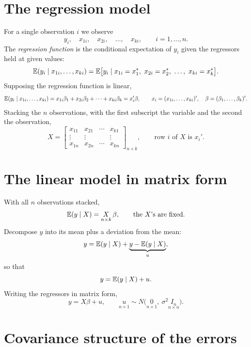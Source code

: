 \documentclass[11pt]{article}
\begin{document}

\section{The regression model}

For a single observation $i$ we observe
\[ y_i,\quad x_{1i},\quad x_{2i},\quad \dots,\quad x_{ki},
   \qquad i=1,\dots,n . \]
The \emph{regression function} is the conditional expectation of $y_i$ given the
regressors held at given values:
\[ \E(y_i\mid x_{1i},\dots,x_{ki})
   =\E\bigl[y_i \mid x_{1i}=x_1^{*},\ x_{2i}=x_2^{*},\ \dots,\ x_{ki}=x_k^{*}\bigr]. \]
Supposing the regression function is linear,
\[ \mathbb{E}(y_i\mid x_{1i},\dots,x_{ki})=x_{1i}\beta_1+x_{2i}\beta_2+\dots+x_{ki}\beta_k=x_i'\beta,
   \qquad x_i=(x_{1i},\dots,x_{ki})',\quad \beta=(\beta_1,\dots,\beta_k)' . \]
Stacking the $n$ observations, with the first subscript the variable and the second
the observation,
\[ X=\begin{bmatrix}
      x_{11} & x_{21} & \cdots & x_{k1}\\
      \vdots & \vdots &        & \vdots\\
      x_{1n} & x_{2n} & \cdots & x_{kn}
    \end{bmatrix}_{n\times k},
\qquad\text{row } i \text{ of } X \text{ is } x_i'. \]

\section{The linear model in matrix form}

With all $n$ observations stacked,
\[ \mathbb{E}(y\mid X)=\underset{n\times k}{X}\,\beta, \qquad \text{the } X\text{'s are fixed}. \]
Decompose $y$ into its mean plus a deviation from the mean:
\[ y=\mathbb{E}(y\mid X)+\underbrace{y-\mathbb{E}(y\mid X)}_{u}, \]
so that
\[ y=\mathbb{E}(y\mid X)+u . \]
Writing the regressors in matrix form,
\[ y=X\beta+u,\qquad \underset{n\times1}{u}\sim N\bigl(\underset{n\times1}{0},\ \sigma^2\underset{n\times n}{I_n}\bigr). \]

\section{Covariance structure of the errors}
\end{document}
